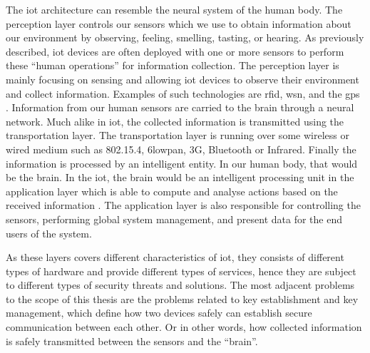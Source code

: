 The \gls{iot} architecture can resemble the neural system of the human body. The perception layer controls our sensors which we use to obtain information about our environment by observing, feeling, smelling, tasting, or hearing. As previously described, \gls{iot} devices are often deployed with one or more sensors to perform these ``human operations'' for information collection. The perception layer is mainly focusing on sensing and allowing \gls{iot} devices to observe their environment and collect information. Examples of such technologies are \gls{rfid}, \gls{wsn}, and the \gls{gps} \citep{Jing2014}. Information from our human sensors are carried to the brain through a neural network. Much alike in \gls{iot}, the collected information is transmitted using the transportation layer. The transportation layer is running over some wireless or wired medium such as 802.15.4, \gls{6lowpan}, 3G, Bluetooth or Infrared. Finally the information is processed by an intelligent entity. In our human body, that would be the brain. In the \gls{iot}, the brain would be an intelligent processing unit in the application layer which is able to compute and analyse actions based on the received information \cite{iot-layers2012, iot-layers2010}. The application layer is also responsible for controlling the sensors, performing global system management, and present data for the end users of the system.


As these layers covers different characteristics of \gls{iot}, they consists of different types of hardware and provide different types of services, hence they are subject to different types of security threats and solutions. The most adjacent problems to the scope of this thesis are the problems related to key establishment and key management, which define how two devices safely can establish secure communication between each other. Or in other words, how collected information is safely transmitted between the sensors and the ``brain''. 




